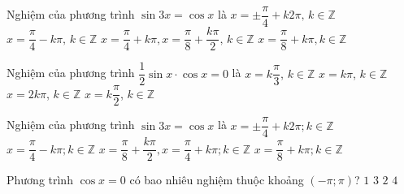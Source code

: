 \begin{ex}%
Nghiệm của phương  trình $\sin 3x = \cos x$ là
\choice
{$x=\pm\dfrac{\pi}{4}+k2\pi,\, k\in\mathbb{Z}$}
{$x=\dfrac{\pi}{4}-k\pi,\, k\in\mathbb{Z}$}
{\True $x=\dfrac{\pi}{4}+k\pi ,x=\dfrac{\pi}{8}+\dfrac{k\pi}{2},\, k\in\mathbb{Z}$}
{$x=\dfrac{\pi}{8}+k\pi, k\in\mathbb{Z}$}
\end{ex}%
\begin{ex}%
	Nghiệm của phương trình $\dfrac{1}{2}\sin x\cdot\cos x = 0$ là
	\choice
	{$x = k\dfrac{\pi}{3}$, $k\in\mathbb{Z}$}
	{$x = k\pi$, $k\in\mathbb{Z}$}
	{$x = 2k\pi$, $k\in\mathbb{Z}$}
	{\True $x = k\dfrac{\pi}{2}$, $k\in\mathbb{Z}$}
\end{ex}%
\begin{ex}%
	Nghiệm của phương trình $\sin 3x = \cos x$ là
	\choice
	{$x = \pm \dfrac{\pi}{4} + k2\pi; k \in \mathbb{Z}$}
	{$x = \dfrac{\pi}{4} - k\pi; k \in \mathbb{Z}$}
	{\True $x = \dfrac{\pi}{8} + \dfrac{k\pi}{2},x = \dfrac{\pi}{4} + k\pi; k \in \mathbb{Z}$}
	{$x = \dfrac{\pi}{8} + k\pi; k \in \mathbb{Z}$}
\end{ex}%
\begin{ex}%
	Phương trình $\cos x=0$ có bao nhiêu nghiệm thuộc khoảng $(-\pi;\pi)$?
	\choice
	{$1$}
	{$3$}
	{\True $2$}
	{$4$}
\end{ex}%
